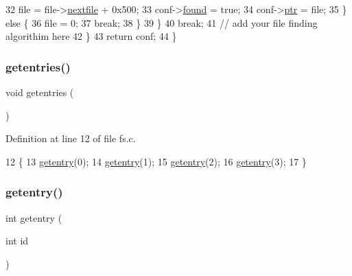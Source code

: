 \begin{DoxyCode}
32                     file = file->\hyperlink{a00330_aa2c7e2e1b3827ce9fbaa045b89202784_aa2c7e2e1b3827ce9fbaa045b89202784}{nextfile} + 0x500;
33                     conf->\hyperlink{a00314_aadd5ca2c6b0ddfb40e058f420907fd7d_aadd5ca2c6b0ddfb40e058f420907fd7d}{found} = \textcolor{keyword}{true};
34                     conf->\hyperlink{a00314_aca270be7272453f34e2b8d9f70142702_aca270be7272453f34e2b8d9f70142702}{ptr} = file;
35                 \} \textcolor{keywordflow}{else} \{
36                     file = 0;
37                     \textcolor{keywordflow}{break};
38                 \}
39             \}
40             \textcolor{keywordflow}{break};
41         \textcolor{comment}{// add your file finding algorithim here}
42     \}
43     \textcolor{keywordflow}{return} conf;
44 \}
\end{DoxyCode}
\mbox{\label{a00143_a414110036132977c34813673360e1a63_a414110036132977c34813673360e1a63}} 
\subsubsection{\texorpdfstring{getentries()}{getentries()}}
{\footnotesize\ttfamily void getentries (\begin{DoxyParamCaption}{ }\end{DoxyParamCaption})}



Definition at line 12 of file fs.\+c.


\begin{DoxyCode}
12                   \{
13     \hyperlink{a00143_a3fb32d07d3bd05144a196c94fc59c0d1_a3fb32d07d3bd05144a196c94fc59c0d1}{getentry}(0);
14     \hyperlink{a00143_a3fb32d07d3bd05144a196c94fc59c0d1_a3fb32d07d3bd05144a196c94fc59c0d1}{getentry}(1);
15     \hyperlink{a00143_a3fb32d07d3bd05144a196c94fc59c0d1_a3fb32d07d3bd05144a196c94fc59c0d1}{getentry}(2);
16     \hyperlink{a00143_a3fb32d07d3bd05144a196c94fc59c0d1_a3fb32d07d3bd05144a196c94fc59c0d1}{getentry}(3);
17 \}
\end{DoxyCode}
\mbox{\label{a00143_a3fb32d07d3bd05144a196c94fc59c0d1_a3fb32d07d3bd05144a196c94fc59c0d1}} 
\subsubsection{\texorpdfstring{getentry()}{getentry()}}
{\footnotesize\ttfamily int getentry (\begin{DoxyParamCaption}\item[{int}]{id }\end{DoxyParamCaption})}



